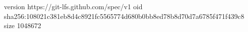 version https://git-lfs.github.com/spec/v1
oid sha256:108021c381eb8d4c8921fc5565774d680b0bb8ed78b8d70d7a6785f471f439c8
size 1048672
